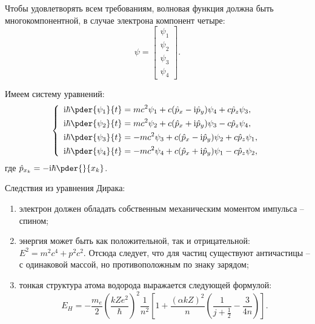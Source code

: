 Чтобы удовлетворять всем требованиям, волновая функция должна быть
многокомпонентной, в случае электрона компонент четыре:
\[
    \psi = \begin{bmatrix} \psi_1 \\ \psi_2 \\ \psi_3 \\ \psi_4 \end{bmatrix}.
\]

Имеем систему уравнений:
\[
    \left\{ \begin{array}{l}
        \ds \i\hbar\pder{\psi_1}{t} = mc^2\psi_1 + c(\hat{p}_x - \i\hat{p}_y)
        \psi_4 + c\hat{p}_z\psi_3, \\[.4em]
        \ds \i\hbar\pder{\psi_2}{t} = mc^2\psi_2 + c(\hat{p}_x + \i\hat{p}_y)
        \psi_3 - c\hat{p}_z\psi_4, \\[.4em]
        \ds \i\hbar\pder{\psi_3}{t} = -mc^2\psi_3 + c(\hat{p}_x - \i\hat{p}_y)
        \psi_2 + c\hat{p}_z\psi_1, \\[.4em]
        \ds \i\hbar\pder{\psi_4}{t} = -mc^2\psi_4 + c(\hat{p}_x + \i\hat{p}_y)
        \psi_1 - c\hat{p}_z\psi_2,
    \end{array} \right.
\]
где \( \ds \hat{p}_{x_k} = -\i\hbar\pder{}{x_k} \).

Следствия из уравнения Дирака:
\begin{enumerate}
    \item электрон должен обладать собственным механическим моментом импульса --
    спином;
    
    \item энергия может быть как положительной, так и отрицательной: \( E^2 =
    m^2c^4 + p^2c^2 \). Отсюда следует, что для частиц существуют античастицы --
    с одинаковой массой, но противоположным по знаку зарядом;
    
    \item тонкая структура атома водорода выражается следующей формулой:
    \[
        E_H = -\frac{m_e}{2}\left(\frac{kZe^2}{\hbar}\right)^2 \frac{1}{n^2}
        \left[1 + \frac{(\alpha kZ)^2}{n}\left(\frac{1}{j + \frac{1}{2}} -
        \frac{3}{4n}\right)\right].
    \]
\end{enumerate}

\newpage
